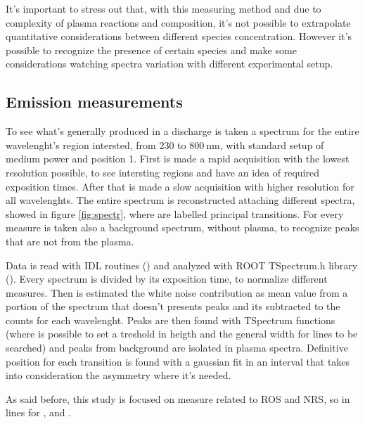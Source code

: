 It's important to stress out that, with this measuring method and due to complexity of plasma reactions and composition, it's not possible to extrapolate quantitative considerations between different species concentration. However it's possible to recognize the presence of certain species and make some considerations watching spectra variation with different experimental setup.


\subsection{Emission measurements}
To see what's generally produced in a discharge is taken a spectrum for the entire wavelenght's region intersted, from $\num{230}$ to $\SI{800}{\nano\meter}$, with standard setup of medium power and position 1.
First is made a rapid acquisition with the lowest resolution possible, to see intersting regions and have an idea of required exposition times. After that is made a slow acquisition with higher resolution for all wavelenghts. The entire spectrum is reconstructed attaching different spectra, showed in figure \ref{fig:spectr}, where are labelled principal transitions.
For every measure is taken also a background spectrum, without plasma, to recognize peaks that are not from the plasma.

Data is read with IDL routines (\cite{GUMLEY200215}) and analyzed with ROOT TSpectrum.h library (\cite{ROOT:TSpectrum}). Every spectrum is divided by its exposition time, to normalize different measures. Then is estimated the white noise contribution as mean value from a portion of the spectrum that doesn't presents peaks and its subtracted to the counts for each wavelenght. Peaks are then found with TSpectrum functions (where is possible to set a treshold in heigth and the general width for lines to be searched) and peaks from background are isolated in plasma spectra. Definitive position for each transition is found with a gaussian fit in an interval that takes into consideration the asymmetry where it's needed.

As said before, this study is focused on measure related to ROS and NRS, so in lines for ,  and .

